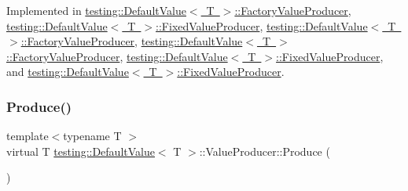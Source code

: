 Implemented in \mbox{\hyperlink{classtesting_1_1_default_value_1_1_factory_value_producer_a246a02412c099b293d905a9749c0fab3}{testing\+::\+Default\+Value$<$ T $>$\+::\+Factory\+Value\+Producer}}, \mbox{\hyperlink{classtesting_1_1_default_value_1_1_fixed_value_producer_ad7f695192e9dbc5f54cdb405655e7125}{testing\+::\+Default\+Value$<$ T $>$\+::\+Fixed\+Value\+Producer}}, \mbox{\hyperlink{classtesting_1_1_default_value_1_1_factory_value_producer_ad669217ac582007bc2e1b08dc13deba5}{testing\+::\+Default\+Value$<$ T $>$\+::\+Factory\+Value\+Producer}}, \mbox{\hyperlink{classtesting_1_1_default_value_1_1_factory_value_producer_ad669217ac582007bc2e1b08dc13deba5}{testing\+::\+Default\+Value$<$ T $>$\+::\+Factory\+Value\+Producer}}, \mbox{\hyperlink{classtesting_1_1_default_value_1_1_fixed_value_producer_a896da438af897dea6a473a11581aac10}{testing\+::\+Default\+Value$<$ T $>$\+::\+Fixed\+Value\+Producer}}, and \mbox{\hyperlink{classtesting_1_1_default_value_1_1_fixed_value_producer_a896da438af897dea6a473a11581aac10}{testing\+::\+Default\+Value$<$ T $>$\+::\+Fixed\+Value\+Producer}}.

\mbox{\label{classtesting_1_1_default_value_1_1_value_producer_adb9e38abe068ac2e792b53fd32bd7e96}} 
\subsubsection{\texorpdfstring{Produce()}{Produce()}\hspace{0.1cm}{\footnotesize\ttfamily [2/3]}}
{\footnotesize\ttfamily template$<$typename T $>$ \\
virtual T \mbox{\hyperlink{classtesting_1_1_default_value}{testing\+::\+Default\+Value}}$<$ T $>$\+::Value\+Producer\+::\+Produce (\begin{DoxyParamCaption}{ }\end{DoxyParamCaption})\hspace{0.3cm}{\ttfamily [pure virtual]}}



